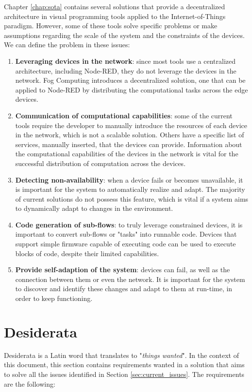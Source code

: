 Chapter \ref{chap:sota} contains several solutions that provide a decentralized architecture in visual programming tools applied to the Internet-of-Things paradigm. However, some of these tools solve specific problems or make assumptions regarding the scale of the system and the constraints of the devices.
We can define the problem in these issues:
\begin{enumerate}
    \item \textbf{Leveraging devices in the network}: since most tools use a centralized architecture, including Node-RED, they do not leverage the devices in the network. Fog Computing introduces a decentralized solution, one that can be applied to Node-RED by distributing the computational tasks across the edge devices.
    \item \textbf{Communication of computational capabilities}: some of the current tools require the developer to manually introduce the resources of each device in the network, which is not a scalable solution. Others have a specific list of services, manually inserted, that the devices can provide. Information about the computational capabilities of the devices in the network is vital for the successful distribution of computation across the devices.
    \item \textbf{Detecting non-availability}: when a device fails or becomes unavailable, it is important for the system to automatically realize and adapt. The majority of current solutions do not possess this feature, which is vital if a system aims to dynamically adapt to changes in the environment.
    \item \textbf{Code generation of sub-flows}: to truly leverage constrained devices, it is important to convert sub-flows or "tasks" into runnable code. Devices that support simple firmware capable of executing code can be used to execute blocks of code, despite their limited capabilities.
    \item \textbf{Provide self-adaption of the system}: devices can fail, as well as the connection between them or even the network. It is important for the system to discover and identify these changes and adapt to them at run-time, in order to keep functioning.
\end{enumerate}

\section{Desiderata}\label{sec:desiderata}

Desiderata is a Latin word that translates to "\emph{things wanted}". In the context of this document, this section contains requirements wanted in a solution that aims to solve all the issues identified in Section \ref{sec:current_issues}. The requirements are the following:

